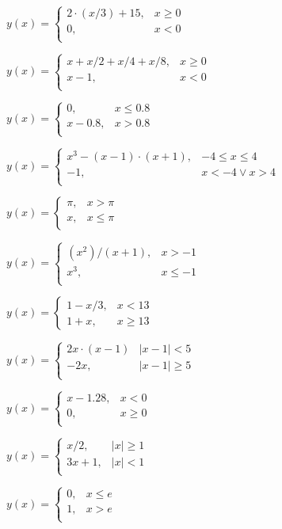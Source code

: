 \begin{variantsMultiPage}[if-else]

$y(x) = \left\{\begin{array}{ll}
2\cdot(x/3) + 15,& x \geqslant 0 \\
0, & x < 0 \\
\end{array}\right.$
\next

$y(x) = \left\{\begin{array}{ll}
x + x/2 +x /4 + x/8, & x \geqslant 0 \\
x-1, & x<0 \\
\end{array}\right.$
\next

$y(x) = \left\{\begin{array}{ll}
0, & x \leqslant 0.8 \\
x - 0.8, & x > 0.8 \\
\end{array}\right.$
\next

$y(x) = \left\{\begin{array}{ll}
 x^3 - (x-1)\cdot(x+1),& -4 \leqslant x \leqslant 4\\
-1 ,& x < -4 \vee x > 4\\
\end{array}\right.$
\next

$y(x) = \left\{\begin{array}{ll}
\pi, & x > \pi \\
x, & x \leqslant \pi \\
\end{array}\right.$
\next

$y(x) = \left\{\begin{array}{ll}
 (x^2)/(x+1), & x > -1\\
 x^3, & x \leqslant -1 \\
\end{array}\right.$
\next

$y(x) = \left\{\begin{array}{ll}
 1 - x/3, & x < 13\\
 1 + x, & x \geqslant 13
\end{array}\right.$
\next

$y(x) = \left\{\begin{array}{ll}
 2x\cdot(x-1) & |x-1|<5\\
 -2x,& |x-1|\geqslant 5\\
\end{array}\right.$
\next

$y(x) = \left\{\begin{array}{ll}
x - 1.28, & x < 0 \\
0, & x \geqslant 0 \\
\end{array}\right.$
\next

$y(x) = \left\{\begin{array}{ll}
 x/2, & |x| \geqslant 1 \\
3x+1, & |x| < 1 \\
\end{array}\right.$
\next

$y(x) = \left\{\begin{array}{ll}
0, & x \leqslant e \\
1, & x > e \\
\end{array}\right.$
\end{variantsMultiPage}